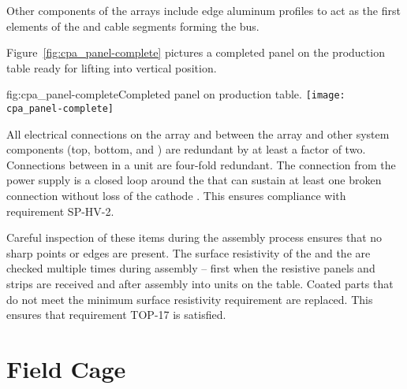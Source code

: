 Other  components of the  arrays include  edge aluminum profiles to act as the first elements of the  and cable segments forming the  bus.

Figure~\ref{fig:cpa_panel-complete} pictures a completed   panel on the production table ready for lifting into vertical position. %

\begin{dunefigure}{fig:cpa_panel-complete}{Completed   panel on production table.}
\texttt{[image: cpa\_panel-complete]}
\end{dunefigure}

All electrical connections on the  array and between the  array and other  system components (top, bottom, and ) are redundant by at least a factor of two.  Connections between  in a  unit are four-fold redundant.  The  connection from the  power supply is a closed loop around the  that can sustain at least one broken connection without loss of the cathode .  This ensures compliance with requirement SP-HV-2.

Careful inspection of these items during the assembly process ensures that no sharp points or edges are present. The surface resistivity of the   and the  are checked multiple times during assembly -- first when the resistive panels and strips are received and after assembly into  units on the table.  Coated parts that do not meet the minimum surface resistivity requirement are replaced.  This ensures that requirement TOP-17 is satisfied. 



\section{Field Cage}


